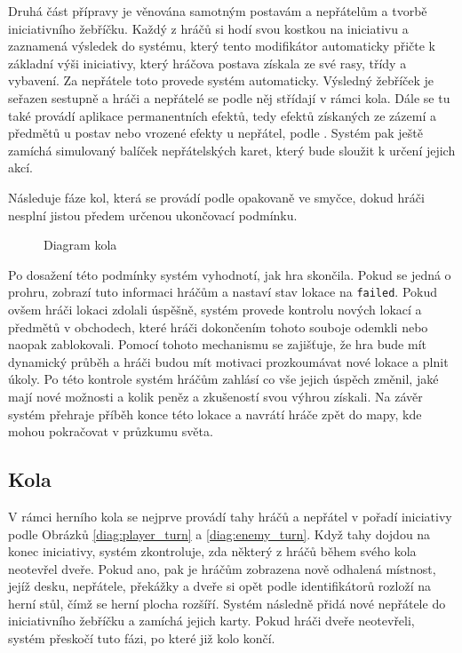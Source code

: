 Druhá část přípravy je věnována samotným postavám a nepřátelům a tvorbě iniciativního žebříčku. Každý z hráčů si hodí svou kostkou na iniciativu a zaznamená výsledek do systému, který tento modifikátor automaticky přičte k základní výši iniciativy, který hráčova postava získala ze své rasy, třídy a vybavení. Za nepřátele toto provede systém automaticky. Výsledný žebříček je seřazen sestupně a hráči a nepřátelé se podle něj střídají v rámci kola. Dále se tu také provádí aplikace permanentních efektů, tedy efektů získaných ze zázemí a předmětů u postav nebo vrozené efekty u nepřátel, podle . Systém pak ještě zamíchá simulovaný balíček nepřátelských karet, který bude sloužit k určení jejich akcí.

Následuje fáze kol, která se provádí podle  opakovaně ve smyčce, dokud hráči nesplní jistou předem určenou ukončovací podmínku.

\begin{figure}[h]
    \centering
    \caption{Diagram kola}
    \label{diag:round}
\end{figure}

Po dosažení této podmínky systém vyhodnotí, jak hra skončila. Pokud se jedná o prohru, zobrazí tuto informaci hráčům a nastaví stav lokace na \texttt{failed}. Pokud ovšem hráči lokaci zdolali úspěšně, systém provede kontrolu nových lokací a předmětů v obchodech, které hráči dokončením tohoto souboje odemkli nebo naopak zablokovali. Pomocí tohoto mechanismu se zajišťuje, že hra bude mít dynamický průběh a hráči budou mít motivaci prozkoumávat nové lokace a plnit úkoly. Po této kontrole systém hráčům zahlásí co vše jejich úspěch změnil, jaké mají nové možnosti a kolik peněz a zkušeností svou výhrou získali. Na závěr systém přehraje příběh konce této lokace a navrátí hráče zpět do mapy, kde mohou pokračovat v průzkumu světa.


\subsection{Kola}
\label{subsec:design_rounds}

V rámci herního kola  se nejprve provádí tahy hráčů a nepřátel v pořadí iniciativy podle Obrázků \ref{diag:player_turn} a \ref{diag:enemy_turn}. Když tahy dojdou na konec iniciativy, systém zkontroluje, zda některý z hráčů během svého kola neotevřel dveře. Pokud ano, pak je hráčům zobrazena nově odhalená místnost, jejíž desku, nepřátele, překážky a dveře si opět podle identifikátorů rozloží na herní stůl, čímž se herní plocha rozšíří. Systém následně přidá nové nepřátele do iniciativního žebříčku a zamíchá jejich karty. Pokud hráči dveře neotevřeli, systém přeskočí tuto fázi, po které již kolo končí.


